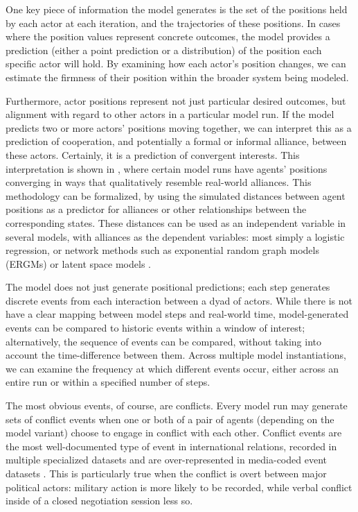One key piece of information the model generates is the set of the positions held by each actor at each iteration, and the trajectories of these positions. In cases where the position values represent concrete outcomes, the model provides a prediction (either a point prediction or a distribution) of the position each specific actor will hold. By examining how each actor's position changes, we can estimate the firmness of their position within the broader system being modeled. 

Furthermore, actor positions represent not just particular desired outcomes, but alignment with regard to other actors in a particular model run. If the model predicts two or more actors' positions moving together, we can interpret this as a prediction of cooperation, and potentially a formal or informal alliance, between these actors. Certainly, it is a prediction of convergent interests. This interpretation is shown in \citet{bdm_1998}, where certain model runs have agents' positions converging in ways that qualitatively resemble real-world alliances. This methodology can be formalized, by using the simulated distances between agent positions as a predictor for alliances or other relationships between the corresponding states. These distances can be used as an independent variable in several models, with alliances as the dependent variables: most simply a logistic regression, or network methods such as exponential random graph models (ERGMs) \citep{robins_2007} or latent space models \citep{hoff_2002}.

The model does not just generate positional predictions; each step generates discrete events from each interaction between a dyad of actors. While there is not have a clear mapping between model steps and real-world time, model-generated events can be compared to historic events within a window of interest; alternatively, the sequence of events can be compared, without taking into account the time-difference between them. Across multiple model instantiations, we can examine the frequency at which different events occur, either across an entire run or within a specified number of steps. 

The most obvious events, of course, are conflicts. Every model run may generate sets of conflict events when one or both of a pair of agents (depending on the model variant) choose to engage in conflict with each other. Conflict events are the most well-documented type of event in international relations, recorded in multiple specialized datasets \citep[e.g.][]{jones_1996,leng_1988,hendrix_2013} and are over-represented in media-coded event datasets \citep{schrodt_2001b}. This is particularly true when the conflict is overt between major political actors: military action is more likely to be recorded, while verbal conflict inside of a closed negotiation session less so.

